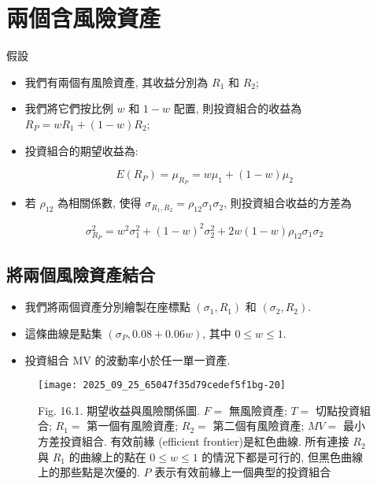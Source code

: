 \documentclass[letterpaper]{article}
\begin{document}
		\section{兩個含風險資產}
		假設  
		
		\begin{itemize}
			\item 我們有兩個有風險資產, 其收益分別為 $R_{1}$ 和 $R_{2}$;  
			\item 我們將它們按比例 $w$ 和 $1-w$ 配置, 則投資組合的收益為 $R_{P}=w R_{1}+ (1-w) R_{2}$;  
			\item 投資組合的期望收益為: 
		\end{itemize}
		
		
		$$
		E\left (R_{P}\right)=\mu_{R_{P}}=w \mu_{1}+ (1-w) \mu_{2}
		$$
		
		\begin{itemize}
			\item 若 $\rho_{12}$ 為相關係數, 使得 $\sigma_{R_{1}, R_{2}}=\rho_{12} \sigma_{1} \sigma_{2}$, 則投資組合收益的方差為  
		\end{itemize}
		
		$$
		\sigma_{R_{P}}^{2}=w^{2} \sigma_{1}^{2}+ (1-w)^{2} \sigma_{2}^{2}+2 w (1-w) \rho_{12} \sigma_{1} \sigma_{2}
		$$
		
		\subsection{將兩個風險資產結合}
		\begin{itemize}
			\item 我們將兩個資產分別繪製在座標點 $ (\sigma_{1}, R_{1})$ 和 $ (\sigma_{2}, R_{2})$.   
			\item 這條曲線是點集 $ (\sigma_{P}, 0.08+0.06w)$, 其中 $0 \leq w \leq 1$.   
			\item 投資組合 MV 的波動率小於任一單一資產.   
		\end{itemize}
		
		\begin{figure}[h]
			\begin{center}
				\texttt{[image: 2025\_09\_25\_65047f35d79cedef5f1bg-20]}
				\caption{Fig. 16.1. 期望收益與風險關係圖.   
					$F=$ 無風險資產;  
					$T=$ 切點投資組合;  
					$R_{1}=$ 第一個有風險資產;
					$R_{2}=$ 第二個有風險資產;  
					$MV=$ 最小方差投資組合.   
					有效前緣 (efficient frontier)是紅色曲線.   
					所有連接 $R_{2}$ 與 $R_{1}$ 的曲線上的點在 $0 \leq w \leq 1$ 的情況下都是可行的, 但黑色曲線上的那些點是次優的.   
					$P$ 表示有效前緣上一個典型的投資組合}
			\end{center}
		\end{figure}
		
\end{document}
